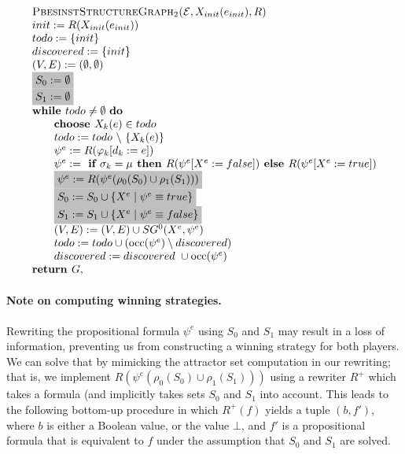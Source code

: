 \documentclass{article}
\begin{document}
\begin{equation*}
\begin{array}{l}
\textsc{PbesinstStructureGraph$_2$(}\mathcal{E}, X_{init}(e_{init}), R) \\ 
init:=R(X_{init}(e_{init})) \\
todo:=\{init\} \\
discovered:=\{init\} \\
(V,E) :=(\emptyset ,\emptyset ) \\ 
\colorbox{lightgray}{$%
S_0:= \emptyset $}\\
\colorbox{lightgray}{$%
S_1:= \emptyset $}\\
\text{\textbf{while }}todo\neq \emptyset \text{ \textbf{do}} \\ 
\qquad \text{\textbf{choose }}X_{k}(e)\in todo \\ 
\qquad todo:=todo\ \backslash \ \{X_{k}(e)\} \\ 
\qquad \psi ^{e}:=R(\varphi _{k}[d_{k}:=e]) \\ 
\qquad \psi^e := \textbf{ if } \sigma_k = \mu \textbf{ then } R(\psi^e[X^e := false])
\textbf{ else }  R(\psi^e[X^e := true]) \\
\qquad \colorbox{lightgray}{$%
\psi^{e} := R(\psi^e (\rho_0(S_0) \cup \rho_1(S_1) ) ) $}\\
\qquad \colorbox{lightgray}{$%
S_0 := S_0 \cup \{ X^e \mid \psi^e \equiv true \} $}\\
\qquad \colorbox{lightgray}{$%
S_1 := S_1 \cup \{ X^e \mid \psi^e \equiv false \} $}\\
\qquad (V,E) := (V,E) \cup SG^{0}(X^{e},\psi ^{e}) \\ 
\qquad todo:=todo\cup (\mathrm{occ}(\psi ^{e})\setminus discovered) \\
\qquad discovered:=discovered\ \cup \mathrm{occ}(\psi ^{e}) \\
\text{\textbf{return }}G,%
\end{array}%
\end{equation*}%

\paragraph{Note on computing winning strategies.} Rewriting the propositional formula
$\psi^e$ using $S_0$ and $S_1$ may result in a loss of information, preventing us from
constructing a winning strategy for both players. We can solve that by mimicking the
attractor set computation in our rewriting; that is, we implement $R(\psi^e(\rho_0(S_0) \cup \rho_1(S_1)))$
using a rewriter $R^+$ which takes a formula (and implicitly takes sets $S_0$ and $S_1$ into account. 
This leads to the following bottom-up
procedure in which $R^+(f)$ yields a tuple $(b, f')$, where $b$ is either a Boolean value,
or the value $\bot$, and $f'$ is a propositional formula that is equivalent to $f$ under
the assumption that $S_0$ and $S_1$ are solved.
\end{document}
